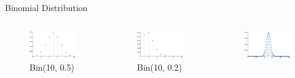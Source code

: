 \documentclass[11pt,pdf,ngerman,UKenglish]{beamer}%
\newcommand{\1}{\mathbb{1}}
\theoremstyle{thm}
\theoremstyle{def}
\begin{document}
\begin{frame}{Binomial Distribution}
\vspace*{-9mm}
\begin{columns}[c]
        \begin{figure}
            \includegraphics[scale=0.4]{BinomialPDF_10_05.png}
    	\caption{Bin(10, 0.5)}
        \end{figure}
\vspace*{-9mm}
        \begin{figure}
            \includegraphics[scale=0.4]{BinomialPDF_10_02.png}
    	\caption{Bin(10, 0.2)}
        \end{figure}
        \begin{figure}
             \includegraphics[scale=0.4]{BinomialPDF_100_05.png} 

\end{figure}
\end{columns}
\end{frame}
\end{document}
